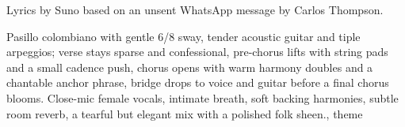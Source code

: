 

\begin{notes}
Lyrics by Suno based on an unsent WhatsApp message by Carlos Thompson.
\end{notes}

\begin{style}
Pasillo colombiano with gentle 6/8 sway, tender acoustic guitar and tiple arpeggios; verse stays sparse and confessional, pre-chorus lifts with string pads and a small cadence push, chorus opens with warm harmony doubles and a chantable anchor phrase, bridge drops to voice and guitar before a final chorus blooms. %
Close-mic female vocals, intimate breath, soft backing harmonies, subtle room reverb, a tearful but elegant mix with a polished folk sheen., theme
\end{style}

